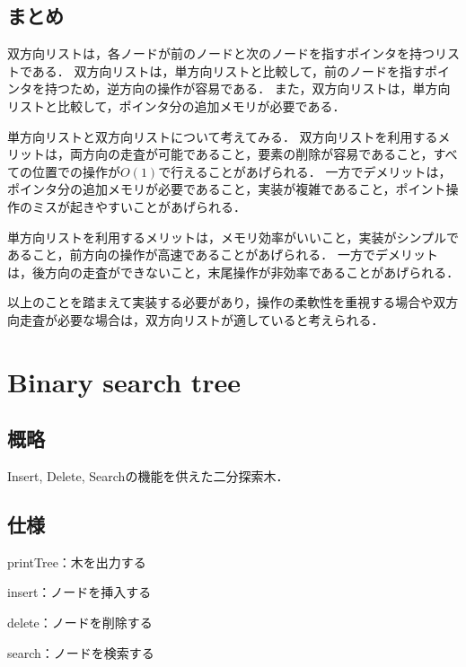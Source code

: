\documentclass{ltjsarticle}
\begin{document}
\subsection{まとめ}
双方向リストは，各ノードが前のノードと次のノードを指すポインタを持つリストである．
双方向リストは，単方向リストと比較して，前のノードを指すポインタを持つため，逆方向の操作が容易である．
また，双方向リストは，単方向リストと比較して，ポインタ分の追加メモリが必要である．

単方向リストと双方向リストについて考えてみる．
双方向リストを利用するメリットは，両方向の走査が可能であること，要素の削除が容易であること，すべての位置での操作が$O(1)$で行えることがあげられる．
一方でデメリットは，ポインタ分の追加メモリが必要であること，実装が複雑であること，ポイント操作のミスが起きやすいことがあげられる．

単方向リストを利用するメリットは，メモリ効率がいいこと，実装がシンプルであること，前方向の操作が高速であることがあげられる．
一方でデメリットは，後方向の走査ができないこと，末尾操作が非効率であることがあげられる．

以上のことを踏まえて実装する必要があり，操作の柔軟性を重視する場合や双方向走査が必要な場合は，双方向リストが適していると考えられる．

\section{Binary search tree}
\subsection{概略}
Insert, Delete, Searchの機能を供えた二分探索木．

\subsection{仕様}
\noindent printTree：木を出力する

\noindent insert：ノードを挿入する

\noindent delete：ノードを削除する

\noindent search：ノードを検索する
\end{document}

